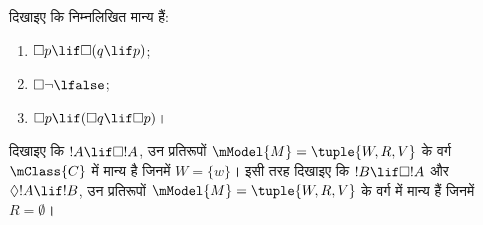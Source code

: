 \documentclass[../../../include/open-logic-section]{subfiles}
\begin{document}
\begin{prob}
  दिखाइए कि निम्नलिखित मान्य हैं:
  \begin{enumerate}
  \item $\Box p \lif \Box (q \lif p)$;
  \item $\Box \lnot \lfalse$;
  \item $\Box p \lif (\Box q \lif \Box p)$।
  \end{enumerate}
\end{prob}

\begin{prob}
  दिखाइए कि $!A \lif \Box!A$, उन प्रतिरूपों
  $\mModel{M} = \tuple{W, R, V}$ के वर्ग $\mClass{C}$ में मान्य है जिनमें
  $W = \{w\}$। इसी तरह दिखाइए कि $!B \lif \Box !A$ और
  $\Diamond !A \lif !B$, उन प्रतिरूपों $\mModel{M} = \tuple{W, R, V}$ के
  वर्ग में मान्य हैं जिनमें $R = \emptyset$।
\end{prob}
\end{document}
